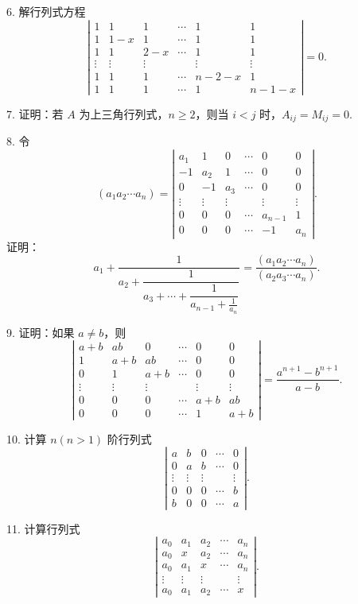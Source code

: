 \documentclass[UTF8, 12pt, fontset=fandol, oneside]{ctexart}
\begin{document}
6. 解行列式方程
\[
\left|\begin{array}{cccccc}
1&1&1&\cdots&1&1\\
1&1-x&1&\cdots&1&1\\
1&1&2-x&\cdots&1&1\\
\vdots&\vdots&\vdots&&\vdots&\vdots\\
1&1&1&\cdots&n-2-x&1\\
1&1&1&\cdots&1&n-1-x
\end{array}\right|=0.
\]

7. 证明：若 $A$ 为上三角行列式，$n\ge2$，则当 $i<j$ 时，$A_{ij}=M_{ij}=0$.

8. 令
\[
(a_1a_2\cdots a_n)=
\left|\begin{array}{cccccc}
a_1&1&0&\cdots&0&0\\
-1&a_2&1&\cdots&0&0\\
0&-1&a_3&\cdots&0&0\\
\vdots&\vdots&\vdots&&\vdots&\vdots\\
0&0&0&\cdots&a_{n-1}&1\\
0&0&0&\cdots&-1&a_n
\end{array}\right|.
\]
证明：
\[
a_1+\frac1{a_2+\dfrac1{a_3+\cdots+\dfrac1{a_{n-1}+\frac1{a_n}}}}
=\frac{(a_1a_2\cdots a_n)}{(a_2a_3\cdots a_n)}.
\]

9. 证明：如果 $a\ne b$，则
\[
\left|\begin{array}{cccccc}
a+b&ab&0&\cdots&0&0\\
1&a+b&ab&\cdots&0&0\\
0&1&a+b&\cdots&0&0\\
\vdots&\vdots&\vdots&&\vdots&\vdots\\
0&0&0&\cdots&a+b&ab\\
0&0&0&\cdots&1&a+b
\end{array}\right|
=\frac{a^{n+1}-b^{n+1}}{a-b}.
\]

10. 计算 $n(n>1)$ 阶行列式
\[
\left|\begin{array}{ccccc}
a&b&0&\cdots&0\\
0&a&b&\cdots&0\\
\vdots&\vdots&\vdots&&\vdots\\
0&0&0&\cdots&b\\
b&0&0&\cdots&a
\end{array}\right|.
\]

11. 计算行列式
\[
\left|\begin{array}{ccccc}
a_0&a_1&a_2&\cdots&a_n\\
a_0&x&a_2&\cdots&a_n\\
a_0&a_1&x&\cdots&a_n\\
\vdots&\vdots&\vdots&&\vdots\\
a_0&a_1&a_2&\cdots&x
\end{array}\right|.
\]
\end{document}
